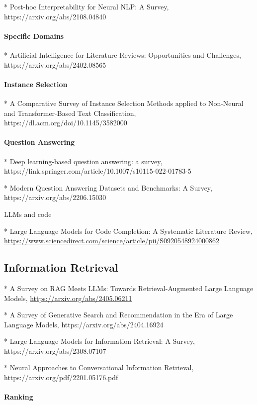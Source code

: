 * Post-hoc Interpretability for Neural NLP: A Survey, https://arxiv.org/abs/2108.04840
 
\paragraph{Specific Domains}

* Artificial Intelligence for Literature Reviews: Opportunities and Challenges, https://arxiv.org/abs/2402.08565
 
\paragraph{Instance Selection}

* A Comparative Survey of Instance Selection Methods applied to Non-Neural and Transformer-Based Text Classification, https://dl.acm.org/doi/10.1145/3582000 

\paragraph{Question Answering}

* Deep learning-based question answering: a survey, https://link.springer.com/article/10.1007/s10115-022-01783-5

* Modern Question Answering Datasets and Benchmarks: A Survey, https://arxiv.org/abs/2206.15030

LLMs and code

* Large Language Models for Code Completion: A Systematic Literature Review, 
\url{https://www.sciencedirect.com/science/article/pii/S0920548924000862}
 
\subsection{Information Retrieval}

* A Survey on RAG Meets LLMs: Towards Retrieval-Augmented Large Language Models, \url{https://arxiv.org/abs/2405.06211}

* A Survey of Generative Search and Recommendation in the Era of Large Language Models,
https://arxiv.org/abs/2404.16924

* Large Language Models for Information Retrieval: A Survey, https://arxiv.org/abs/2308.07107

* Neural Approaches to Conversational Information Retrieval, https://arxiv.org/pdf/2201.05176.pdf

\paragraph{Ranking}

